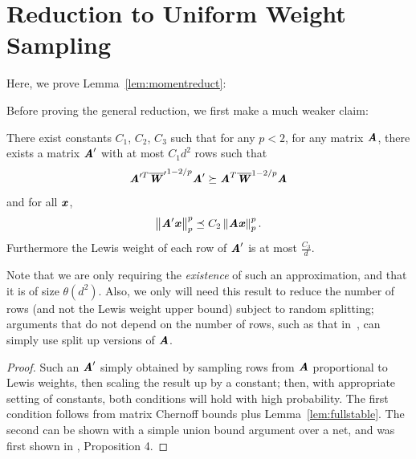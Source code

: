 \section{Reduction to Uniform Weight Sampling}
\label{sec:reduct}
Here, we prove Lemma~\ref{lem:momentreduct}:

\momentreduct*

Before proving the general reduction, we first make a much weaker claim:
\begin{lemma}
\label{lem:weakbound}
There exist constants $C_1$, $C_2$, $C_3$ such that for any $p < 2$, for any matrix $\AA$, there
exists a matrix $\AA'$ with at most $C_1 d^2$ rows such that
\begin{equation*}
\AA'^T {\WWbar'}^{1-2/p} \AA' \succeq \AA^T \WWbar^{1-2/p} \AA
\end{equation*}
and for all $\xx$,
\begin{equation*}
\norm{\AA' \xx}_p^p \preceq C_2 \norm{\AA \xx}_p^p.
\end{equation*}
Furthermore the Lewis weight of each row of $\AA'$ is at most $\frac{C_3}{d}$.
\end{lemma}
Note that we are only requiring the \emph{existence} of such an approximation, and that it is of size $\theta(d^2)$.
Also, we only will need this result to reduce the number of rows (and not the Lewis weight upper bound) subject to
random splitting; arguments that do not depend on the number of rows, such as that in~\cite{Talagrand90}, can simply
use split up versions of $\AA$.

\begin{proof}
Such an $\AA'$ simply obtained by sampling rows from $\AA$ proportional to Lewis weights, then scaling the result up
by a constant; then, with appropriate setting of constants, both conditions will hold with high probability.
The first condition follows from matrix Chernoff bounds plus Lemma~\ref{lem:fullstable}.  The second can be shown
with a simple union bound argument over a net, and was first shown in \cite{Schechtman}, Proposition 4.
\end{proof}

